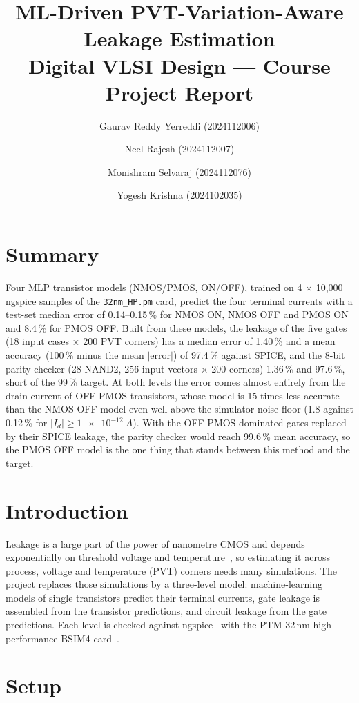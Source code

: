 \documentclass[11pt,a4paper]{article}
\title{ML-Driven PVT-Variation-Aware Leakage Estimation\\[2pt]
       \large Digital VLSI Design --- Course Project Report}
\author{%
  Gaurav Reddy Yerreddi (2024112006) \and
  Neel Rajesh (2024112007) \and
  Monishram Selvaraj (2024112076) \and
  Yogesh Krishna (2024102035)}
\date{}
\begin{document}
\maketitle

\section*{Summary}
Four MLP transistor models (NMOS/PMOS, ON/OFF), trained on 4 $\times$ 10{,}000 ngspice samples of the
\texttt{32nm\_HP.pm} card, predict the four terminal currents with a test-set median error of 0.14--0.15\,\%
for NMOS ON, NMOS OFF and PMOS ON and 8.4\,\% for PMOS OFF. Built from these models, the leakage of the
five gates (18 input cases $\times$ 200 PVT corners) has a median error of 1.40\,\% and a mean accuracy
(100\,\% minus the mean $|$error$|$) of 97.4\,\% against SPICE, and the 8-bit parity checker (28 NAND2,
256 input vectors $\times$ 200 corners) 1.36\,\% and 97.6\,\%, short of the 99\,\% target. At both levels
the error comes almost entirely from the drain current of OFF PMOS transistors, whose model is 15 times
less accurate than the NMOS OFF model even well above the simulator noise floor (1.8 against 0.12\,\%
for $|I_d| \ge \SI{1e-12}{A}$). With the OFF-PMOS-dominated gates replaced by their SPICE leakage, the
parity checker would reach 99.6\,\% mean accuracy, so the PMOS OFF model is the one thing that stands
between this method and the target.

\section{Introduction}
Leakage is a large part of the power of nanometre CMOS and depends exponentially on threshold voltage
and temperature~\cite{roy2003}, so estimating it across process, voltage and temperature (PVT) corners
needs many simulations. The project replaces those simulations by a three-level model: machine-learning
models of single transistors predict their terminal currents, gate leakage is assembled from the
transistor predictions, and circuit leakage from the gate predictions. Each level is checked against
ngspice~\cite{ngspice} with the PTM 32\,nm high-performance BSIM4 card~\cite{ptm,bsim4}.

\section{Setup}
\end{document}
